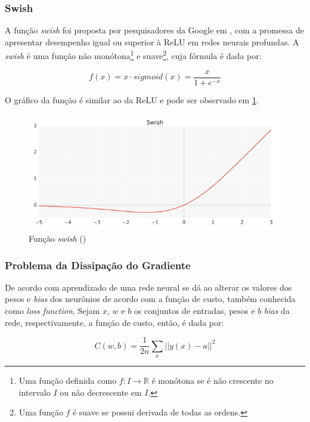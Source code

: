 \subsubsection{Swish}

A função \textit{swish} foi proposta por pesquisadores da 
Google em \cite{swish}, com a promessa de apresentar desempenho igual 
ou superior à ReLU em redes neurais profundas. A \textit{swish} é uma função 
não monótona\footnote{Uma função definida como $f: I \rightarrow \mathbb{R}$
é monótona se é não crescente no intervalo $I$ ou não decrescente em $I$.} e 
suave\footnote{Uma função $f$ é suave se possui derivada de todas as ordens.},
cuja fórmula é dada por:

\begin{equation}
  f(x) = x \cdot sigmoid(x) = \frac{x}{1+e^{-x}}
\end{equation}


O gráfico da função é similar ao da ReLU e pode ser observado em \ref{fig:swish}.

\begin{figure}[H] 
  \includegraphics[width= 12cm]{../figuras/swish.png}
  \caption{Função \textit{swish} (\cite{swish})}
  \label{fig:swish}
\end{figure}


\subsubsection{Problema da Dissipação do Gradiente}
\label{sec:vanishing_gradient_problem}

De acordo com \cite{neuralnetworksanddeeplearning} aprendizado de uma rede neural se dá ao alterar os valores dos pesos
e \textit{bias} dos neurônios de acordo com a função de custo, também conhecida 
como \textit{loss function}. Sejam $x$, $w$ e $b$ os conjuntos de entradas,
pesos e $b$ \textit{bias} da rede, respectivamente, a função de custo, então, é dada por:

\begin{equation}
  C(w,b) = \frac{1}{2n}\sum_x || y(x) - a ||^2
\label{eq:func_custo}
\end{equation}

